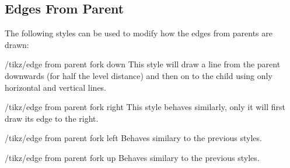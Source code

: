 \subsection{Edges From Parent}

The following styles can be used to modify how the edges from parents
are drawn:

\begin{stylekey}{/tikz/edge from parent fork down}
  This style will draw a line from the parent downwards (for half the
  level distance) and then on to the child using only horizontal and
  vertical lines. 
\begin{codeexample}[]
\end{codeexample}
\end{stylekey}

\begin{stylekey}{/tikz/edge from parent fork right}
  This style behaves similarly, only it will first draw its edge to
  the right.
\begin{codeexample}[]
\end{codeexample}
\end{stylekey}

\begin{stylekey}{/tikz/edge from parent fork left}
  Behaves similary to the previous styles.
\end{stylekey}

\begin{stylekey}{/tikz/edge from parent fork up}
  Behaves similary to the previous styles.
\end{stylekey}


